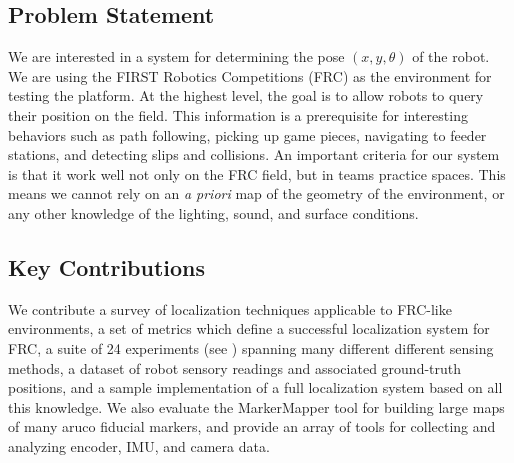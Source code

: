 \documentclass{article}
\newcommand{\Newnameref}[1]{\textit{\nameref{#1}}}
\begin{document}
\subsection{Problem Statement}

  We are interested in a system for determining the pose $(x, y, \theta)$ of the robot. We are using the FIRST Robotics Competitions (FRC) as the environment for testing the platform. At the highest level, the goal is to allow robots to query their position on the field. This information is a prerequisite for interesting behaviors such as path following, picking up game pieces, navigating to feeder stations, and detecting slips and collisions. An important criteria for our system is that it work well not only on the FRC field, but in teams practice spaces. This means we cannot rely on an \textit{a priori} map of the geometry of the environment, or any other knowledge of the lighting, sound, and surface conditions.





\subsection{Key Contributions}

  We contribute a survey of localization techniques applicable to FRC-like environments, a set of metrics which define a successful localization system for FRC, a suite of 24 experiments (see \Newnameref{section:experiments}) spanning many different different sensing methods, a dataset of robot sensory readings and associated ground-truth positions, and a sample implementation of a full localization system based on all this knowledge. We also evaluate the MarkerMapper tool for building large maps of many aruco fiducial markers, and provide an array of tools for collecting and analyzing encoder, IMU, and camera data.
\end{document}
